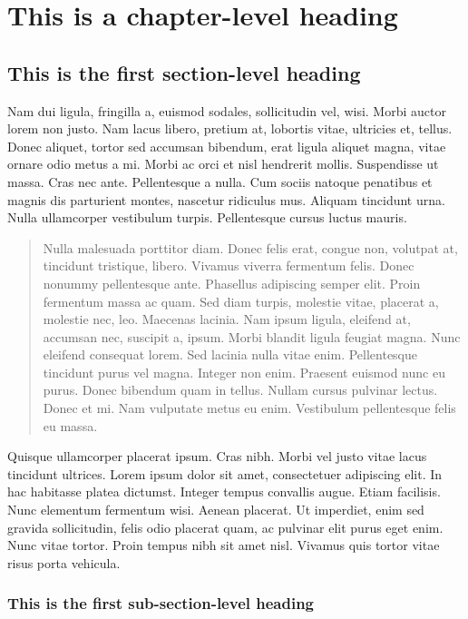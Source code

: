 \chapter{This is a chapter-level heading}

\lipsum[1]

\section{This is the first section-level heading}

Nam dui ligula, fringilla a, euismod sodales, sollicitudin vel, wisi. Morbi auctor
lorem non justo. Nam lacus libero, pretium at, lobortis vitae, ultricies et, tellus. Donec
aliquet, tortor sed accumsan bibendum, erat ligula aliquet magna, vitae ornare odio
metus a mi. Morbi ac orci et nisl hendrerit mollis. Suspendisse ut massa. Cras nec ante.
Pellentesque a nulla. Cum sociis natoque penatibus et magnis dis parturient montes,
nascetur ridiculus mus. Aliquam tincidunt urna. Nulla ullamcorper vestibulum turpis.
Pellentesque cursus luctus mauris.
\begin{quote}
Nulla malesuada porttitor diam. Donec felis erat, congue non, volutpat
at, tincidunt tristique, libero. Vivamus viverra fermentum felis. Donec
nonummy pellentesque ante. Phasellus adipiscing semper elit. Proin
fermentum massa ac quam. Sed diam turpis, molestie vitae, placerat
a, molestie nec, leo. Maecenas lacinia. Nam ipsum ligula, eleifend at,
accumsan nec, suscipit a, ipsum. Morbi blandit ligula feugiat magna.
Nunc eleifend consequat lorem. Sed lacinia nulla vitae enim. Pellentesque
tincidunt purus vel magna. Integer non enim. Praesent euismod nunc eu
purus. Donec bibendum quam in tellus. Nullam cursus pulvinar lectus.
Donec et mi. Nam vulputate metus eu enim. Vestibulum pellentesque
felis eu massa.
\end{quote}
Quisque ullamcorper placerat ipsum. Cras nibh. Morbi vel justo vitae lacus tincidunt
ultrices. Lorem ipsum dolor sit amet, consectetuer adipiscing elit. In hac habitasse
platea dictumst. Integer tempus convallis augue. Etiam facilisis. Nunc elementum
fermentum wisi. Aenean placerat. Ut imperdiet, enim sed gravida sollicitudin, felis
odio placerat quam, ac pulvinar elit purus eget enim. Nunc vitae tortor. Proin tempus
nibh sit amet nisl. Vivamus quis tortor vitae risus porta vehicula.

\subsection{This is the first sub-section-level heading}


